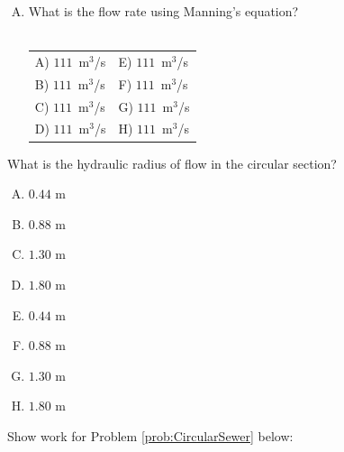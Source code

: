 \documentclass[11pt]{article}
\begin{document}
\begin{enumerate}
\begin{enumerate}[A)]
\item What is the flow rate using Manning's equation?\\~\\
\begin{tabular}{p{2in} p{2in}  } 
A) $111$~m$^3$/s & E) $111$~m$^3$/s \\ 
B) $111$~m$^3$/s & F) $111$~m$^3$/s  \\
C) $111$~m$^3$/s & G) $111$~m$^3$/s  \\
D) $111$~m$^3$/s & H) $111$~m$^3$/s  \\
\end{tabular}

\end{enumerate}


What is the hydraulic radius of flow in the circular section?
\begin{enumerate} [(A)]
\item $0.44$ m
\item $0.88$ m
\item $1.30$ m
\item $1.80$ m
\item $0.44$ m
\item $0.88$ m
\item $1.30$ m
\item $1.80$ m
\end{enumerate}

Show work for Problem \ref{prob:CircularSewer} below:





\end{enumerate}
\end{document}
